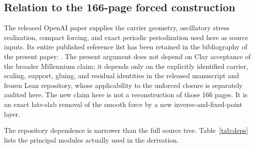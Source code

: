 \documentclass[11pt]{article}
\numberwithin{equation}{section}
\begin{document}
\subsection{Relation to the 166-page forced construction}
The released OpenAI paper \cite{OpenAI2026NS} supplies the carrier geometry, oscillatory stress realization, compact forcing, and exact periodic periodization used here as source inputs.  Its entire published reference list has been retained in the bibliography of the present paper: \cite{AlbrittonBrueColombo2022,BillantGallaire2005,BillantGallaire2013,BuckmasterVicol2019,CKN1982,CordobaMartinezZoroa2023,CordobaMartinezZoroa2024,CordobaMartinezZoroaZheng2026,CraikCriminale1986,DaneriSzekelyhidi2017,EscauriazaSereginSverak2003,Euler1757,FeffermanClay,FriedlanderVishik1991,LeibovichStewartson1983,Leray1934,LifschitzHameiri1991,Navier1827,SinghSridhar2017,Stein1970,Stokes1845,Tao2016}.  The present argument does not depend on Clay acceptance of the broader Millennium claim; it depends only on the explicitly identified carrier, scaling, support, gluing, and residual identities in the released manuscript and frozen Lean repository, whose applicability to the unforced closure is separately audited here.  The new claim here is not a reconstruction of those 166 pages.  It is an exact late-slab removal of the smooth force by a new inverse-and-fixed-point layer.

The repository dependence is narrower than the full source tree.  Table~\ref{tab:deps} lists the principal modules actually used in the derivation.
\end{document}
